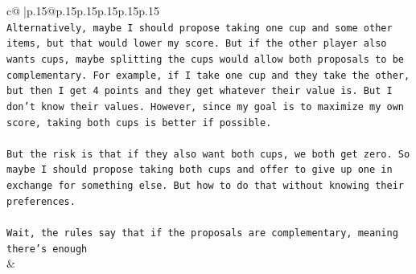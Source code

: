 \documentclass{article}
\begin{document}
{\begin{supertabular}{c@{$\;$}|p{.15\linewidth}@{}p{.15\linewidth}p{.15\linewidth}p{.15\linewidth}p{.15\linewidth}p{.15\linewidth}}
{{{\\ 
\texttt{Alternatively, maybe I should propose taking one cup and some other items, but that would lower my score. But if the other player also wants cups, maybe splitting the cups would allow both proposals to be complementary. For example, if I take one cup and they take the other, but then I get 4 points and they get whatever their value is. But I don't know their values. However, since my goal is to maximize my own score, taking both cups is better if possible.} \\
\\ 
\texttt{But the risk is that if they also want both cups, we both get zero. So maybe I should propose taking both cups and offer to give up one in exchange for something else. But how to do that without knowing their preferences.} \\
\\ 
\texttt{Wait, the rules say that if the proposals are complementary, meaning there's enough} \\
            }
        }
    }
    & \\ \\


\end{supertabular}}
\end{document}
